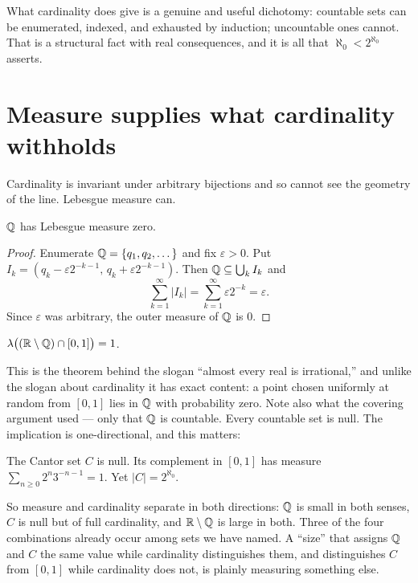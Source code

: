 \documentclass{essay}
\newcommand{\Irr}{\R \setminus \Q}
\begin{document}
What cardinality does give is a genuine and useful dichotomy:
countable sets can be enumerated, indexed, and exhausted by induction;
uncountable ones cannot. That is a structural fact with real
consequences, and it is all that $\aleph_0 < 2^{\aleph_0}$ asserts.

\section{Measure supplies what cardinality withholds}

Cardinality is invariant under arbitrary bijections and so cannot see
the geometry of the line. Lebesgue measure can.

\begin{theorem}
$\mathbb{Q}$ has Lebesgue measure zero.
\end{theorem}

\begin{proof}
Enumerate $\mathbb{Q} = \{q_1, q_2, \dots\}$ and fix $\varepsilon > 0$. Put
$I_k = (q_k - \varepsilon 2^{-k-1},\, q_k + \varepsilon 2^{-k-1})$.
Then $\mathbb{Q} \subseteq \bigcup_k I_k$ and
\[
  \sum_{k=1}^{\infty} |I_k| = \sum_{k=1}^{\infty} \varepsilon 2^{-k}
  = \varepsilon .
\]
Since $\varepsilon$ was arbitrary, the outer measure of $\mathbb{Q}$ is $0$.
\end{proof}

\begin{corollary}
$\lambda\big((\Irr) \cap [0,1]\big) = 1$.
\end{corollary}

This is the theorem behind the slogan ``almost every real is
irrational,'' and unlike the slogan about cardinality it has exact
content: a point chosen uniformly at random from $[0,1]$ lies in $\mathbb{Q}$
with probability zero. Note also what the covering argument used ---
only that $\mathbb{Q}$ is countable. Every countable set is null. The
implication is one-directional, and this matters:

\begin{example}
The Cantor set $C$ is null. Its complement in $[0,1]$ has measure
$\sum_{n \geq 0} 2^n 3^{-n-1} = 1$. Yet $|C| = 2^{\aleph_0}$.
\end{example}

So measure and cardinality separate in both directions: $\mathbb{Q}$ is small
in both senses, $C$ is null but of full cardinality, and $\Irr$ is
large in both. Three of the four combinations already occur among sets
we have named. A ``size'' that assigns $\mathbb{Q}$ and $C$ the same value
while cardinality distinguishes them, and distinguishes $C$ from
$[0,1]$ while cardinality does not, is plainly measuring something
else.
\end{document}
